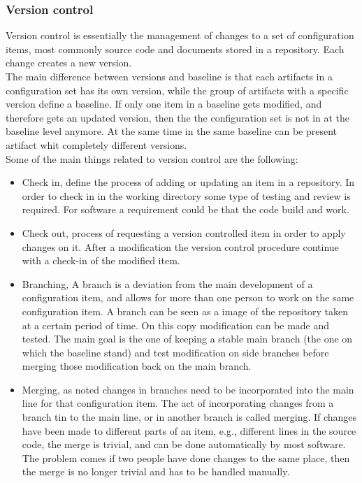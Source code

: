\documentclass[../main.tex]{subfiles}
\begin{document}
\subsubsection{Version control}
Version control is essentially the management of changes to a set of configuration items, most commonly source code and documents stored in a repository. Each change creates a new version.\\ 
The main difference between versions and baseline is that each artifacts in a configuration set has its own version, while the group of artifacts with a specific version define a baseline. If only one item in a baseline gets modified, and therefore gets an updated version, then the the configuration set is not in at the baseline level anymore. At the same time in the same baseline can be present artifact whit completely different versions.\\
Some of the main things related to version control are the following:
\begin{itemize}
    \item Check in, define the process of adding or updating an item in a repository. In order to check in in the working directory some type of testing and review is required. For software a requirement could be that the code build and work. 
    \item Check out, process of requesting a version controlled item in order to apply changes on it. After a modification the version control procedure continue with a check-in of the modified item. 
    \item Branching, A branch is a deviation from the main development of a configuration item, and allows for more than one person to work on the same configuration item. A branch can be seen as a image of the repository taken at a certain period of time. On this copy modification can be made and tested. The main goal is the one of keeping a stable main branch (the one on which the baseline stand) and test modification on side branches before merging those modification back on the main branch.
    \item Merging, as noted changes in branches need to be incorporated into the main line for that configuration item. The act of incorporating changes from a branch tin to the main line, or in another branch is called merging. If changes have been made to different parts of an item, e.g., different lines in the source code, the merge is trivial, and can be done automatically by most software. The problem comes if two people have done changes to the same place, then the merge is no longer trivial and has to be handled manually.
\end{itemize}
\end{document}
